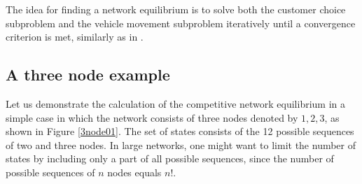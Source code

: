 \documentclass[dissertation,draft*]{aaltoseries}
\begin{document}
The idea for finding a network equilibrium is to solve 
both the customer choice subproblem and the vehicle movement subproblem iteratively 
until a convergence criterion is met, similarly as in \citep{yang2010}. 
% 

\subsection{A three node example}
\label{compexample}
Let us demonstrate the calculation of the competitive network equilibrium in a simple case 
in which the network consists of three nodes denoted by $1,2,3$, as shown in Figure \ref{3node01}. 
The set of states consists of the 12 possible sequences of two and three nodes. 
In large networks, one might want to
limit the number of states by including only a part of all 
possible sequences, since the number of possible sequences of $n$ nodes equals $n!$. 
\end{document}
